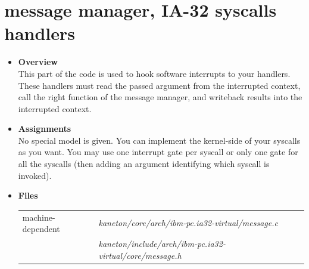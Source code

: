 \newpage

\section{message manager, \textbf{IA-32 syscalls handlers}}
\begin{itemize}
  \item {\bf Overview}\\

    This part of the code is used to hook software interrupts to your
    handlers. These handlers must read the passed argument from the
    interrupted context, call the right function of the message
    manager, and writeback results into the interrupted context.

  \item {\bf Assignments}\\

    No special model is given. You can implement the kernel-side of
    your syscalls as you want. You may use one interrupt gate per
    syscall or only one gate for all the syscalls (then adding an
    argument identifying which syscall is invoked).

  \item {\bf {Files}}\\

    \begin{tabular}{| l | l |}
      \hline
      machine-dependent & {\em kaneton/core/arch/ibm-pc.ia32-virtual/message.c}\\
      & {\em kaneton/include/arch/ibm-pc.ia32-virtual/core/message.h}\\\hline
    \end{tabular}

\end{itemize}

